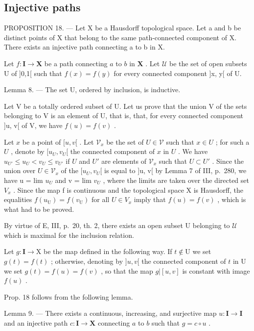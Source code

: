 \subsection{Injective paths}

PROPOSITION 18. --- Let X be a Hausdorff topological space. Let a and b be distinct points of X that belong to the same path-connected component of X. There exists an injective path connecting a to b in X.

Let \(f \colon \mathbf{I} \to \mathbf{X}\) be a path connecting \(a\) to \(b\) in \(\mathbf{X}\) . Let \(\mathcal{U}\) be the set of open subsets \(\mathrm{U}\) of {]}0,1{[} such that \(f(x) = f(y)\) for every connected component {]}x, y{[} of U.

Lemma 8. --- The set U, ordered by inclusion, is inductive.

Let V be a totally ordered subset of U. Let us prove that the union V of the sets belonging to V is an element of U, that is, that, for every connected component {]}u, v{[} of V, we have \(f(u) = f(v)\) .

Let \(x\) be a point of \([u, v[\) . Let \(\mathcal{V}_x\) be the set of \(U \in \mathcal{V}\) such that \(x \in U\) ; for such a \(U\) , denote by \([u_U, v_U[\) the connected component of \(x\) in \(U\) . We have \(u_{U'} \leqslant u_U < v_U \leqslant v_{U'}\) if \(U\) and \(U'\) are elements of \(\mathcal{V}_x\) such that \(U \subset U'\) . Since the union over \(U \in \mathcal{V}_x\) of the \([u_U, v_U[\) is equal to {]}u, v{[} by Lemma 7 of III, p.~280, we have u = lim \(u_{U}\) and v = lim \(v_{U}\) , where the limits are taken over the directed set \(V_{x}\) . Since the map f is continuous and the topological space X is Hausdorff, the equalities \(f(u_{\mathrm{U}}) = f(v_{\mathrm{U}})\) for all \(U \in V_{x}\) imply that \(f(u) = f(v)\) , which is what had to be proved.

By virtue of E, III, p.~20, th. 2, there exists an open subset U belonging to \(\mathcal{U}\) which is maximal for the inclusion relation.

Let \(g \colon \mathbf{I} \to \mathrm{X}\) be the map defined in the following way. If \(t \notin \mathrm{U}\) we set \(g(t) = f(t)\) ; otherwise, denoting by \(]u, v[\) the connected component of \(t\) in \(\mathrm{U}\) we set \(g(t) = f(u) = f(v)\) , so that the map \(g|[u, v]\) is constant with image \(f(u)\) .

Prop. 18 follows from the following lemma.

Lemma 9. --- There exists a continuous, increasing, and surjective map \(u\colon\mathbf{I}\to\mathbf{I}\) and an injective path \(c\colon\mathbf{I}\to\mathbf{X}\) connecting \(a\) to \(b\) such that \(g=c\circ u\) .


